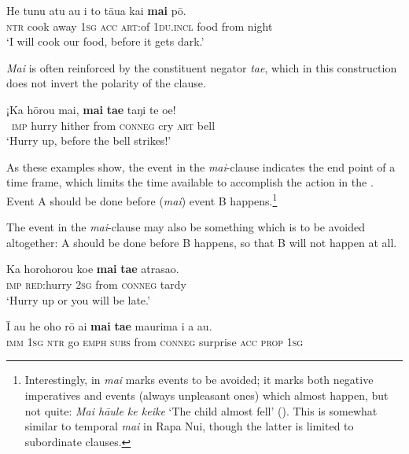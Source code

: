 \ea\label{ex:11.204}
\gll He tunu atu au i to tāua kai \textbf{mai} pō. \\
\textsc{ntr} cook away \textsc{1sg} \textsc{acc} \textsc{art}:of \textsc{1du.incl} food from night \\

\glt
‘I will cook our food, before it gets dark.’ \textstyleExampleref{[R229.140]} 
\z

\textit{Mai} is often reinforced by the constituent negator \textit{ta{\ꞌ}e}, which in this construction does not invert the polarity of the clause.

\ea\label{ex:11.205}
\gll ¡Ka hōrou mai, \textbf{mai} \textbf{ta{\ꞌ}e} taŋi te oe!\\
~\textsc{imp} hurry hither from \textsc{conneg} cry \textsc{art} bell\\

\glt
‘Hurry up, before the bell strikes!’ \textstyleExampleref{[R334.077]} 
\z

As these examples show, the event in the \textit{mai}{}-clause indicates the end point of a time frame, which limits the time available to accomplish the action in the . Event A should be done before (\textit{mai}) event B happens.\footnote{\label{fn:528}Interestingly, in  \textit{mai} marks events to be avoided; it marks both negative imperatives and events (always unpleasant ones) which almost happen, but not quite: \textit{Mai hā{\ꞌ}ule ke keike} ‘The child almost fell’ (\citealt[61–63]{ElbertPukui1979}). This is somewhat similar to temporal \textit{mai} in Rapa Nui, though the latter is limited to subordinate clauses.} 

The event in the \textit{mai}{}-clause may also be something which is to be avoided altogether: A should be done before B happens, so that B will not happen at all.

\ea\label{ex:11.206}
\gll Ka horohorou koe \textbf{mai} \textbf{ta{\ꞌ}e} {\ꞌ}atrasao. \\
\textsc{imp} \textsc{red}:hurry \textsc{2sg} from \textsc{conneg} tardy \\

\glt 
‘Hurry up or you will be late.’ \textstyleExampleref{[R245.019]} 
\z

\ea\label{ex:11.207}
\gll {\ꞌ}Ī au he oho rō {\ꞌ}ai \textbf{mai} \textbf{ta{\ꞌ}e} ma{\ꞌ}urima i a au. \\
\textsc{imm} \textsc{1sg} \textsc{ntr} go \textsc{emph} \textsc{subs} from \textsc{conneg} surprise \textsc{acc} \textsc{prop} \textsc{1sg} \\

